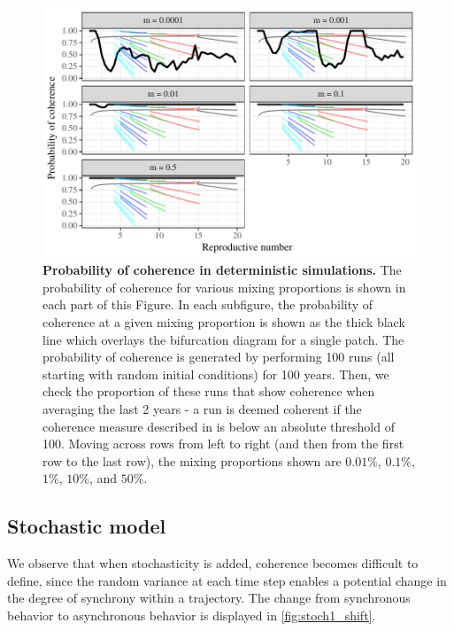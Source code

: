 \documentclass[12pt]{article}
\begin{document}
\begin{figure}
\centering
\includegraphics[width=\textwidth]{supplementary/probabilitycoherence}
\caption{\textbf{Probability of coherence in deterministic simulations.} The probability of coherence for various mixing proportions is shown in each part of this Figure. In each subfigure, the probability of coherence at a given mixing proportion is shown as the thick black line which overlays the bifurcation diagram for a single patch. The probability of coherence is generated by performing 100 runs (all starting with random initial conditions) for 100 years. Then, we check the proportion of these runs that show coherence when averaging the last 2 years - a run is deemed coherent if the coherence measure described in  is below an absolute threshold of 100. Moving across rows from left to right (and then from the first row to the last row), the mixing proportions shown are $0.01\%$, $0.1\%$, $1\%$, $10\%$, and $50\%$.}
\label{fig:deterministic_panel}
\end{figure}
\subsection{Stochastic model} \label{ss:stochastic}

We observe that when stochasticity is added, coherence becomes difficult to define, since the random variance at each time step enables a potential change in the degree of synchrony within a trajectory. The change from synchronous behavior to asynchronous behavior is displayed in \autoref{fig:stoch1_shift}.
\end{document}
